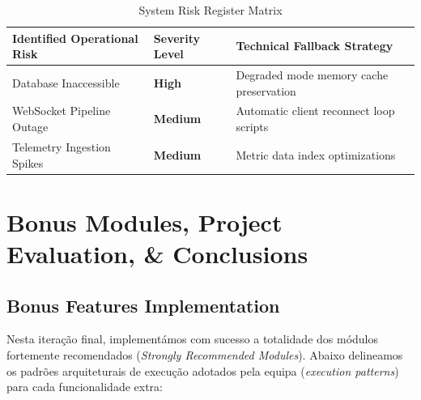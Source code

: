 \documentclass[11pt,a4paper]{article}
\begin{document}
\begin{table}[H]
\centering
\caption{System Risk Register Matrix}
\label{tab:risk_matrix}
\renewcommand{\arraystretch}{1.2}
\begin{tabular}{lll}
\rowcolor{primaryblue} \textbf{\color{white}Identified Operational Risk} & \textbf{\color{white}Severity Level} & \textbf{\color{white}Technical Fallback Strategy} \\
\midrule
Database Inaccessible & \color{red}\bfseries High & Degraded mode memory cache preservation \\
\rowcolor{softgray} WebSocket Pipeline Outage & \color{orange}\bfseries Medium & Automatic client reconnect loop scripts \\
Telemetry Ingestion Spikes & \color{orange}\bfseries Medium & Metric data index optimizations \\
\bottomrule
\end{tabular}
\end{table}

\section{Bonus Modules, Project Evaluation, \& Conclusions}

\subsection{Bonus Features Implementation}
Nesta iteração final, implementámos com sucesso a totalidade dos módulos fortemente recomendados (\textit{Strongly Recommended Modules}). Abaixo delineamos os padrões arquiteturais de execução adotados pela equipa (\textit{execution patterns}) para cada funcionalidade extra:
\end{document}
